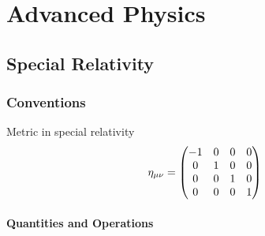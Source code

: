 \documentclass[letterpaper,10pt,english]{sphinxmanual}
\begin{document}
\chapter{Advanced Physics}
\label{index:advanced-physics}

\section{Special Relativity}
\label{relativity/SpecialRelativity::doc}\label{relativity/SpecialRelativity:special-relativity}

\subsection{Conventions}
\label{relativity/SpecialRelativity:conventions}
Metric in special relativity
\begin{gather}
\begin{split}\eta_{\mu\nu}=\begin{pmatrix}
     -1 & 0 & 0 & 0\\
     0 & 1 & 0 & 0\\
     0 & 0 & 1 & 0\\
     0 & 0 & 0 & 1\\
\end{pmatrix}\end{split}\notag
\end{gather}

\subsubsection{Quantities and Operations}
\label{relativity/SpecialRelativity:quantities-and-operations}
\end{document}
